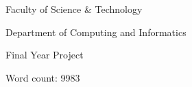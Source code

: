 \documentclass[11pt, twoside]{report}
\begin{document}




\vspace*{\fill}
\begingroup
\centering
Faculty of Science \& Technology

Department of Computing and Informatics

Final Year Project

\endgroup
\vspace*{\fill}







\hypersetup{
	citecolor=black,
	filecolor=black,
	linkcolor=black,
	urlcolor=black
}

\tableofcontents
\listoffigures

\cleardoublepage
{}













Word count: 9983





\end{document}
